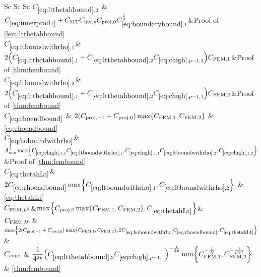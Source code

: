 {\begin{landscape}
\begin{longtabu}{Sc Sc Sc}
    $\Csecond$ &$\Cfourteen  + \CMT \CinvVhp \Cmmofn{0}\Cboundaryo^{\half}$&Proof of \cref{lem:ltthetahbound}\\
  $\CLtboundo$&$ 2\mleft(\Cfirst + \Csecond\Chighfn{p-1,1}\mright)\CFEMo$&Proof of \cref{thm:fembound}\\
  $\CLtboundt$&$2\mleft(\Cfirst + \Csecond\Chighfn{p-1,1}\mright)\CFEMt$&Proof of \cref{thm:fembound}\\
  $\Crhoendbound$ & $2\mleft(\Cmmofn{-1} + \Cmmofn{0}\mright)\max\set{\CFEMo,\CFEMt}$ & \cref{eq:rhoendbound}\\
  $\CHobound$&$\Amin^{\half}\max\set{\Chighfn{1,1}\CLtboundo,\Chighfn{1,1}\CLtboundt,\Chighfn{1,2}}$&Proof of \cref{thm:fembound}\\
      $\CthetahLt$& $2\Crhoendbound \max\set{\CLtboundo,\CLtboundt} $ & \cref{eq:thetahLt}\\
  $C_{\mathrm{FEM},L^{2}}$&$\max\set{\Cmmofn{0}\max\set{\CFEMo,\CFEMt},\CthetahLt}$&\\
$C_{\mathrm{FEM},H^{1}}$&$\max\set{2\mleft(\Cmmofn{-1}+\Cmmofn{0}\mright)\max\set{\CFEMo,\CFEMt},2\CHobound\Crhoendbound,\CthetahLt} $&\\
    $C_{\mathrm{cond}}$ & $\displaystyle\frac1{4^{2p}} \mleft(\Csecond\Chighfn{p-1,1}\mright)^{-\frac1{2p}} \min\set{\CFEMo^{-\frac1{2p}},\CFEMt^{-\frac1{p+1}}}$ & \cref{thm:fembound}\\
\bottomrule
\end{longtabu}
\end{landscape}
}
